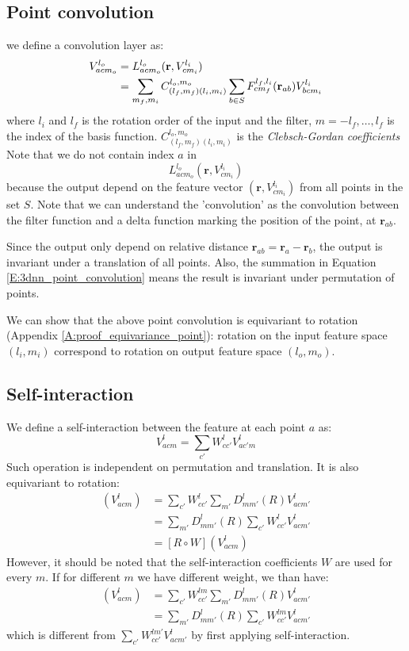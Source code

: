 \documentclass{IEEEtran}
\begin{document}
\subsection*{Point convolution}
we define a convolution layer as:
\begin{align}
    V_{acm_o}^{l_o} &= L^{l_o}_{acm_o} (\mathbf{r}, V_{cm_i}^{l_i}) \notag\\
    &= \sum_{m_f, m_i} C^{l_o,m_o}_{(l_f, m_f)(l_i,m_i)} \sum_{b \in S} F_{cm_f}^{l_f, l_i}(\mathbf{r}_{ab}) V^{l_i}_{bcm_i} \label{E:3dnn_point_convolution}
\end{align}
where $l_i$ and $l_f$ is the rotation order of the input and the filter, $m = -l_f, \dots, l_f$ is the index of the basis function.
$C^{l_o,m_o}_{(l_f, m_f)(l_i,m_i)}$ is the \emph{Clebsch-Gordan coefficients}
Note that we do not contain index $a$ in \[L^{l_o}_{acm_o} (\mathbf{r}, V_{cm_i}^{l_i})\] because
the output depend on the feature vector $(\mathbf{r}, V_{cm_i}^{l_i})$ from all points in the set $S$.
Note that we can understand the 'convolution' as the convolution between the filter function and a delta function 
marking the position of the point, at $\mathbf{r}_{ab}$.

Since the output only depend on relative distance $\mathbf{r}_{ab} = \mathbf{r}_{a} - \mathbf{r}_{b} $, 
the output is invariant under a translation of all points. Also, the summation in Equation \eqref{E:3dnn_point_convolution}
means the result is invariant under permutation of points.

We can show that the above point convolution is equivariant to rotation (Appendix \ref{A:proof_equivariance_point}):
rotation on the input feature space $(l_i,m_i)$ 
correspond to rotation on output feature space $(l_o,m_o)$.

\subsection*{Self-interaction}
We define a self-interaction between the feature at each point $a$ as:
\begin{equation}
    V_{acm}^{l} = \sum_{c'} W^{l}_{cc'} V_{ac'm}^{l} 
\end{equation}
Such operation is independent on permutation and translation. It is also equivariant to rotation:
\begin{align*}
    [ W \circ R ] (V_{acm}^l) &= \sum_{c'} W^{l}_{cc'} \sum_{m'}D_{mm'}^l(R)V_{acm'}^l \\
                &= \sum_{m'}D_{mm'}^l(R) \sum_{c'} W^{l}_{cc'}  V_{acm'}^l \\
                &= [ R \circ W ] (V_{acm}^l)
\end{align*}
However, it should be noted that the self-interaction coefficients $W$ are used for every $m$. 
If for different $m$ we have different weight, we than have:
\begin{align*}
    [ W \circ R ] (V_{acm}^l) &= \sum_{c'} W^{lm}_{cc'} \sum_{m'}D_{mm'}^l(R)V_{acm'}^l \\
                &= \sum_{m'}D_{mm'}^l(R) \sum_{c'} W^{lm}_{cc'}  V_{acm'}^l 
\end{align*}
which is different from $\sum_{c'} W^{lm'}_{cc'}  V_{acm'}^l$ by first applying self-interaction.
\end{document}
